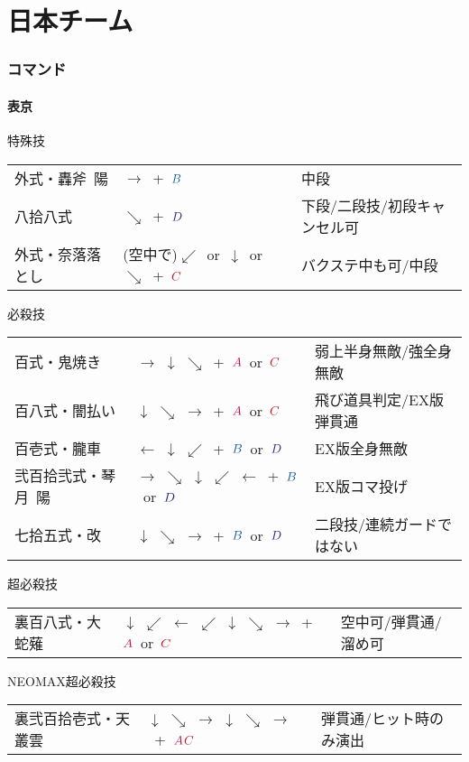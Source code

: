 \documentclass[a4j,11pt]{jarticle}
\def\A{$\textcolor{Acolor}{A}$}
\def\C{$\textcolor{Ccolor}{C}$}
\def\B{$\textcolor{Bcolor}{B}$}
\def\D{$\textcolor{Dcolor}{D}$}
\begin{document}
\newpage
\part{日本チーム}
\section{コマンド}
\subsection{表京}
\begin{itembox}[l]{特殊技}
\begin{tabular}{lll}
外式・轟斧\ 陽&$\rightarrow$\ +\ \B&中段\\
八拾八式&$\searrow$\ +\ \D&下段/二段技/初段キャンセル可\\
外式・奈落落とし&(空中で)$\swarrow$\ or\ $\downarrow$\ or\ $\searrow$\ +\ \C&バクステ中も可/中段
\end{tabular}
\end{itembox}
\begin{itembox}[l]{必殺技}
\begin{tabular}{lll}
百式・鬼焼き&$\rightarrow$ $\downarrow$ $\searrow$\ +\ \A\ or\ \C&弱上半身無敵/強全身無敵\\
百八式・闇払い&$\downarrow$ $\searrow$ $\rightarrow$\ +\ \A\ or\ \C&飛び道具判定/EX版弾貫通\\ 
百壱式・朧車&$\leftarrow$ $\downarrow$ $\swarrow$\ +\ \B\ or\ \D&EX版全身無敵\\
弐百拾弐式・琴月\ 陽&$\rightarrow$ $\searrow$ $\downarrow$ $\swarrow$ $\leftarrow$\ +\ \B\ or\ \D&EX版コマ投げ\\
七拾五式・改&$\downarrow$ $\searrow$ $\rightarrow$\ +\ \B\ or\ \D&二段技/連続ガードではない
\end{tabular}
\end{itembox}
\begin{itembox}[l]{超必殺技}
\begin{tabular}{lll}
裏百八式・大蛇薙&$\downarrow$ $\swarrow$ $\leftarrow$ $\swarrow$ $\downarrow$ $\searrow$ $\rightarrow$\ +\ \A\ or\ \C& 空中可/弾貫通/溜め可
\end{tabular}
\end{itembox}
\begin{itembox}[l]{NEOMAX超必殺技}
\begin{tabular}{lll}
裏弐百拾壱式・天叢雲&$\downarrow$ $\searrow$ $\rightarrow$ $\downarrow$ $\searrow$ $\rightarrow$\ +\ \A\C&弾貫通/ヒット時のみ演出
\end{tabular}
\end{itembox}
\newpage
\end{document}
